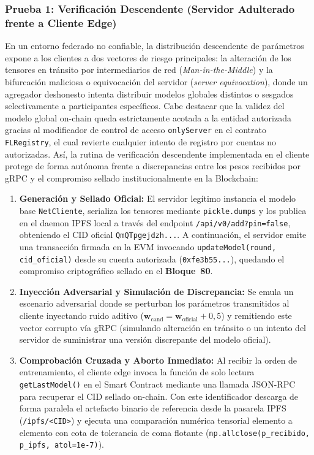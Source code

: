 \subsubsection{Prueba 1: Verificación Descendente (Servidor Adulterado frente a Cliente Edge)}
\label{subsubsec:ataque_descendente}
En un entorno federado no confiable, la distribución descendente de parámetros expone a los clientes a dos vectores de riesgo principales: la alteración de los tensores en tránsito por intermediarios de red (\textit{Man-in-the-Middle}) y la bifurcación maliciosa o equivocación del servidor (\textit{server equivocation}), donde un agregador deshonesto intenta distribuir modelos globales distintos o sesgados selectivamente a participantes específicos. Cabe destacar que la validez del modelo global on-chain queda estrictamente acotada a la entidad autorizada gracias al modificador de control de acceso \texttt{onlyServer} en el contrato \texttt{FLRegistry}, el cual revierte cualquier intento de registro por cuentas no autorizadas. Así, la rutina de verificación descendente implementada en el cliente protege de forma autónoma frente a discrepancias entre los pesos recibidos por gRPC y el compromiso sellado institucionalmente en la Blockchain:
\begin{enumerate}
    \item \textbf{Generación y Sellado Oficial:} El servidor legítimo instancia el modelo base \texttt{NetCliente}, serializa los tensores mediante \texttt{pickle.dumps} y los publica en el daemon IPFS local a través del endpoint \texttt{/api/v0/add?pin=false}, obteniendo el CID oficial \texttt{QmQTpgejdzh...}. A continuación, el servidor emite una transacción firmada en la EVM invocando \texttt{updateModel(round, cid\_oficial)} desde su cuenta autorizada (\texttt{0xfe3b55...}), quedando el compromiso criptográfico sellado en el \textbf{Bloque~80}.
    \item \textbf{Inyección Adversarial y Simulación de Discrepancia:} Se emula un escenario adversarial donde se perturban los parámetros transmitidos al cliente inyectando ruido aditivo ($\mathbf{w}_{\text{cand}} = \mathbf{w}_{\text{oficial}} + 0{,}5$) y remitiendo este vector corrupto vía gRPC (simulando alteración en tránsito o un intento del servidor de suministrar una versión discrepante del modelo oficial).
    \item \textbf{Comprobación Cruzada y Aborto Inmediato:} Al recibir la orden de entrenamiento, el cliente edge invoca la función de solo lectura \texttt{getLastModel()} en el Smart Contract mediante una llamada JSON-RPC para recuperar el CID sellado on-chain. Con este identificador descarga de forma paralela el artefacto binario de referencia desde la pasarela IPFS (\texttt{/ipfs/<CID>}) y ejecuta una comparación numérica tensorial elemento a elemento con cota de tolerancia de coma flotante (\texttt{np.allclose(p\_recibido, p\_ipfs, atol=1e-7)}).
\end{enumerate}

